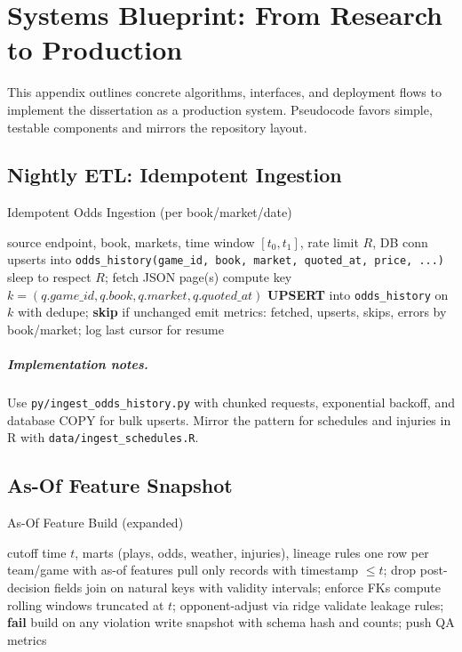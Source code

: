 \chapter{Systems Blueprint: From Research to Production}
\label{app:systems-blueprint}

This appendix outlines concrete algorithms, interfaces, and deployment flows to implement the dissertation as a production system. Pseudocode favors simple, testable components and mirrors the repository layout.

\section{Nightly ETL: Idempotent Ingestion}
\begin{algorithm}[H]
  \caption{Idempotent Odds Ingestion (per book/market/date)}
  \label{alg:ingest-odds}
  \begin{algorithmic}[1]
    \Require source endpoint, book, markets, time window $[t_0,t_1]$, rate limit $R$, DB conn
    \Ensure upserts into \texttt{odds\_history(game\_id, book, market, quoted\_at, price, ...)}
      \State sleep to respect $R$; fetch JSON page(s)
        \State compute key $k=(q.game\_id,q.book,q.market,q.quoted\_at)$
        \State \textbf{UPSERT} into \texttt{odds\_history} on $k$ with dedupe; \textbf{skip} if unchanged
      \EndFor
    \EndFor
    \State emit metrics: {fetched, upserts, skips, errors} by book/market; log last cursor for resume
  \end{algorithmic}
\end{algorithm}

\paragraph{Implementation notes.} Use \texttt{py/ingest\_odds\_history.py} with chunked requests, exponential backoff, and database COPY for bulk upserts. Mirror the pattern for schedules and injuries in R with \texttt{data/ingest\_schedules.R}.

\section{As-Of Feature Snapshot}
\begin{algorithm}[H]
  \caption{As-Of Feature Build (expanded)}
  \label{alg:asof-build}
  \begin{algorithmic}[1]
    \Require cutoff time $t$, marts (plays, odds, weather, injuries), lineage rules
    \Ensure one row per team/game with as-of features
    \State pull only records with timestamp $\le t$; drop post-decision fields
    \State join on natural keys with validity intervals; enforce FKs
    \State compute rolling windows truncated at $t$; opponent-adjust via ridge
    \State validate leakage rules; \textbf{fail} build on any violation
    \State write snapshot with schema hash and counts; push QA metrics
  \end{algorithmic}
\end{algorithm}


